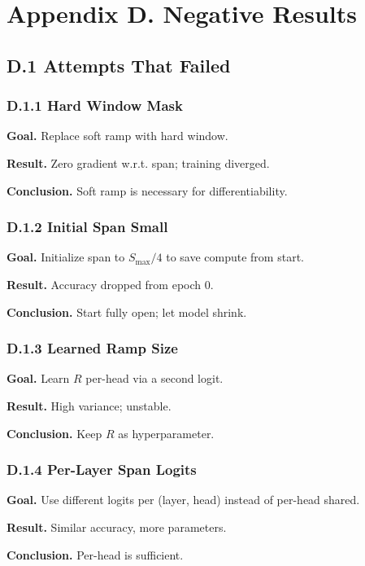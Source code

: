 
\section{Appendix D. Negative Results}

\subsection{D.1 Attempts That Failed}

\subsubsection{D.1.1 Hard Window Mask}

\textbf{Goal.} Replace soft ramp with hard window.

\textbf{Result.} Zero gradient w.r.t. span; training diverged.

\textbf{Conclusion.} Soft ramp is necessary for differentiability.

\subsubsection{D.1.2 Initial Span Small}

\textbf{Goal.} Initialize span to $S_\text{max}/4$ to save compute from start.

\textbf{Result.} Accuracy dropped from epoch 0.

\textbf{Conclusion.} Start fully open; let model shrink.

\subsubsection{D.1.3 Learned Ramp Size}

\textbf{Goal.} Learn $R$ per-head via a second logit.

\textbf{Result.} High variance; unstable.

\textbf{Conclusion.} Keep $R$ as hyperparameter.

\subsubsection{D.1.4 Per-Layer Span Logits}

\textbf{Goal.} Use different logits per (layer, head) instead of per-head shared.

\textbf{Result.} Similar accuracy, more parameters.

\textbf{Conclusion.} Per-head is sufficient.


